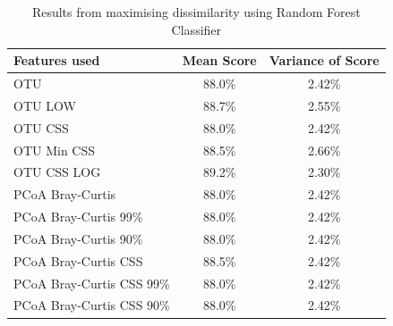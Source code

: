\begin{table}[h]
	\caption{Results from maximising dissimilarity using Random Forest Classifier}
	\centering
	\label{table:rfrdissimilarity}
	\begin{tabular}{l c  c}
		\hline 
		Features used & Mean Score & Variance of Score \\ 
		
		\hline
		OTU & 88.0\% & 2.42\%   \\
		OTU LOW &88.7\%&2.55\%\\
		OTU CSS & 88.0\% & 2.42\%   \\
		OTU Min CSS & 88.5\% & 2.66\%   \\
		OTU CSS LOG & 89.2\%&	2.30\%\\
		PCoA Bray-Curtis &88.0\% & 2.42\%   \\
		PCoA Bray-Curtis 99\% &88.0\% & 2.42\%   \\
		PCoA Bray-Curtis 90\%&88.0\% & 2.42\%   \\
		PCoA Bray-Curtis CSS &88.5\% & 2.42\%   \\
		PCoA Bray-Curtis CSS 99\%&88.0\% & 2.42\%   \\
		PCoA Bray-Curtis CSS 90\%&88.0\% & 2.42\%   \\		
		\hline 
	\end{tabular}
\end{table} 



